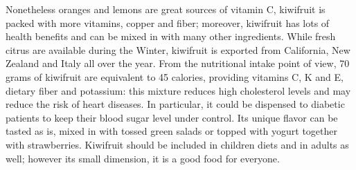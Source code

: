 \documentclass[a4paper,dottedtoc,headinclude,footinclude]{report} %
\theoremstyle{plain}
\begin{document}
    Nonetheless oranges and lemons are great sources of vitamin C,
    kiwifruit is packed with more vitamins, copper and fiber;
    moreover, kiwifruit has lots of health benefits and can be mixed in with
    many other ingredients. While fresh citrus are available during
    the Winter, kiwifruit is exported from California, New Zealand and
    Italy all over the year. From the nutritional intake point of view,
    70 grams of kiwifruit are equivalent to 45 calories,
    providing vitamins C, K and E, dietary fiber and potassium: this
    mixture reduces high cholesterol levels and may reduce the risk of
    heart diseases. In particular, it could be dispensed to diabetic
    patients to keep their blood sugar level under control. Its
    unique flavor can be tasted as is, mixed in with tossed green salads
    or topped with yogurt together with strawberries.  Kiwifruit
    should be included in children diets and in adults as well;
    however its small dimension, it is a good food for everyone.
    

    \iffalse
    \nocite{*}
    \addtocontents{toc}{\protect\vspace{\beforebibskip}}
    \addcontentsline{toc}{section}{\refname}    
    
    
    \fi
\end{document}
